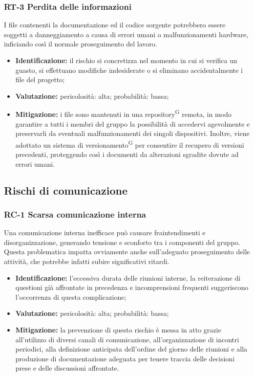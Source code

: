 \documentclass[8pt]{article}
\newcommand{\glossterm}[1]{#1\textsuperscript{G}} %
\begin{document}
\subsubsection{RT-3 Perdita delle informazioni}
I file contenenti la documentazione ed il codice sorgente potrebbero essere soggetti a danneggiamento a causa di errori umani o malfunzionamenti hardware, inficiando così il normale proseguimento del lavoro.
\begin{itemize}
\setlength\itemsep{0em}
    \item \textbf{Identificazione:} il rischio si concretizza nel momento in cui si verifica un guasto, si effettuano modifiche indesiderate o si eliminano accidentalmente i file del progetto;
    \item \textbf{Valutazione:} pericolosità: alta; probabilità: bassa;
    \item \textbf{Mitigazione:} i file sono mantenuti in una \glossterm{repository} remota, in modo garantire a tutti i membri del gruppo la possibilità di accedervi agevolmente e preservarli da eventuali malfunzionamenti dei singoli dispositivi. Inoltre, viene adottato un sistema di \glossterm{versionamento} per consentire il recupero di versioni precedenti, proteggendo così i documenti da alterazioni sgradite dovute ad errori umani. 
\end{itemize}
\subsection{Rischi di comunicazione}
\subsubsection{RC-1 Scarsa comunicazione interna}
Una comunicazione interna inefficace può causare fraintendimenti e disorganizzazione, generando tensione e sconforto tra i componenti del gruppo. Questa problematica impatta ovviamente anche sull'adeguato proseguimento delle attività, che potrebbe infatti subire significativi ritardi.
\begin{itemize}
\setlength\itemsep{0em}
    \item \textbf{Identificazione:} l'eccessiva durata delle riunioni interne, la reiterazione di questioni già affrontate in precedenza e incomprensioni frequenti suggeriscono l'occorrenza di questa complicazione;
    \item \textbf{Valutazione:} pericolosità: alta; probabilità: bassa;
    \item \textbf{Mitigazione:} la prevenzione di questo rischio è messa in atto grazie all'utilizzo di diversi canali di comunicazione, all'organizzazione di incontri periodici, alla definizione anticipata dell'ordine del giorno delle riunioni e alla produzione di documentazione adeguata per tenere traccia delle decisioni prese e delle discussioni affrontate.
\end{itemize}
\end{document}
